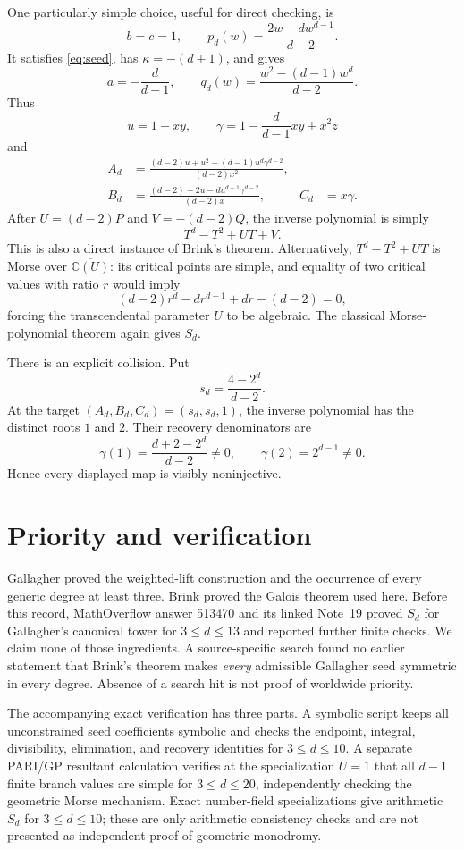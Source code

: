 \documentclass[11pt]{article}
\theoremstyle{remark}
\newcommand{\C}{\mathbb C}
\begin{document}
One particularly simple choice, useful for direct checking, is
\[
 b=c=1,\qquad
 p_d(w)=\frac{2w-dw^{d-1}}{d-2}.
\]
It satisfies \eqref{eq:seed}, has $\kappa=-(d+1)$, and gives
\[
 a=-\frac d{d-1},\qquad
 q_d(w)=\frac{w^2-(d-1)w^d}{d-2}.
\]
Thus
\[
 u=1+xy,\qquad
 \gamma=1-\frac d{d-1}xy+x^2z
\]
and
\begin{align*}
 A_d&=\frac{(d-2)u+u^2-(d-1)u^d\gamma^{d-2}}
              {(d-2)x^2},\\
 B_d&=\frac{(d-2)+2u-du^{d-1}\gamma^{d-2}}
              {(d-2)x},&
 C_d&=x\gamma.
\end{align*}
After $U=(d-2)P$ and $V=-(d-2)Q$, the inverse polynomial is simply
\[
 T^d-T^2+UT+V.
\]
This is also a direct instance of Brink's theorem.  Alternatively,
$T^d-T^2+UT$ is Morse over $\overline{\C(U)}$: its critical points are
simple, and equality of two critical values with ratio $r$ would imply
\[
 (d-2)r^d-dr^{d-1}+dr-(d-2)=0,
\]
forcing the transcendental parameter $U$ to be algebraic.  The classical
Morse-polynomial theorem \cite[Theorem 4.4.5]{Serre} again gives $S_d$.

There is an explicit collision.  Put
\[
 s_d=\frac{4-2^d}{d-2}.
\]
At the target $(A_d,B_d,C_d)=(s_d,s_d,1)$, the inverse polynomial has the
distinct roots $1$ and $2$.  Their recovery denominators are
\[
 \gamma(1)=\frac{d+2-2^d}{d-2}\ne0,\qquad
 \gamma(2)=2^{d-1}\ne0.
\]
Hence every displayed map is visibly noninjective.

\section{Priority and verification}

Gallagher \cite{Gallagher} proved the weighted-lift construction and the
occurrence of every generic degree at least three.  Brink
\cite{Brink} proved the Galois theorem used here.  Before this record,
MathOverflow answer 513470 and its linked Note~19
\cite{MO,Note19} proved $S_d$ for Gallagher's canonical tower for
$3\le d\le13$ and reported further finite checks.  We claim none of those
ingredients.  A source-specific search found no earlier statement that
Brink's theorem makes \emph{every} admissible Gallagher seed symmetric in
every degree.  Absence of a search hit is not proof of worldwide priority.

The accompanying exact verification has three parts.  A symbolic script
keeps all unconstrained seed coefficients symbolic and checks the endpoint,
integral, divisibility, elimination, and recovery identities for
$3\le d\le10$.  A separate PARI/GP resultant calculation verifies at the
specialization $U=1$ that all $d-1$ finite branch values are simple for
$3\le d\le20$, independently checking the geometric Morse mechanism.
Exact number-field specializations give arithmetic $S_d$ for
$3\le d\le10$; these are only arithmetic consistency checks and are not
presented as independent proof of geometric monodromy.
\end{document}
